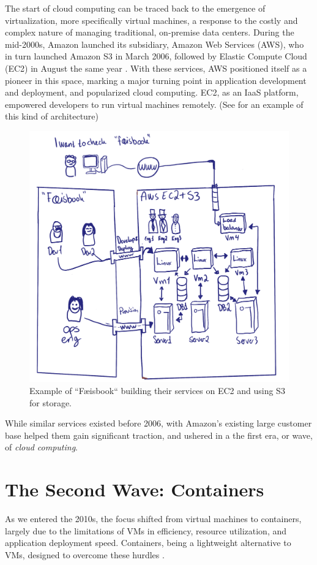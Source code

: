 \documentclass[
  table]{report}
\begin{document}
The start of cloud computing can be traced back to the emergence of
virtualization, more specifically virtual machines, a response to the
costly and complex nature of managing traditional, on-premise data
centers. During the mid-2000s, Amazon launched its subsidiary, Amazon
Web Services (AWS), who in turn launched Amazon S3 in March 2006,
followed by Elastic Compute Cloud (EC2) in August the same year
\citep{barrAmazonEC2Beta2006}. With these services, AWS positioned
itself as a pioneer in this space, marking a major turning point in
application development and deployment, and popularized cloud computing.
EC2, as an \ac{IaaS} platform, empowered developers to run virtual
machines remotely. (See  for an example of this kind
of architecture)

\begin{figure}[H]
\centering
  \includegraphics[width=0.7\columnwidth]{assets/2.2-first-wave-2.png}
  \caption{Example of ``Fæisbook`` building their services on EC2 and using S3
for storage.}
  \label{fig:feisbook}
\end{figure}

While similar services existed before 2006, with Amazon's existing large
customer base helped them gain significant traction, and ushered in a
the first era, or wave, of \emph{cloud computing}.

\section{The Second Wave: Containers}
\label{sect:second-wave}

As we entered the 2010s, the focus shifted from virtual machines to
containers, largely due to the limitations of VMs in efficiency,
resource utilization, and application deployment speed. Containers,
being a lightweight alternative to VMs, designed to overcome these
hurdles \citep{bao2016}.
\end{document}
